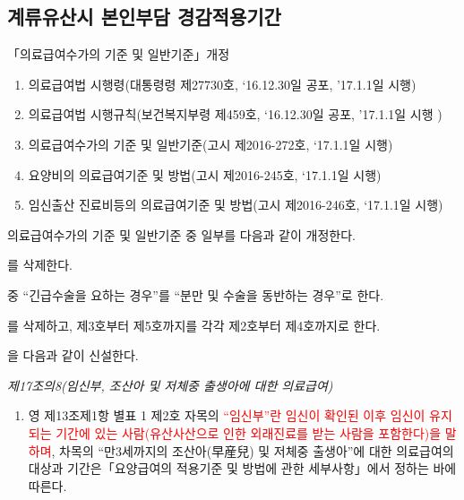 \subsection{계류유산시 본인부담 경감적용기간}
\begin{commentbox}{「의료급여수가의 기준 및 일반기준」개정}
\begin{enumerate}[1)]\tightlist
\item 의료급여법 시행령(대통령령 제27730호, ‘16.12.30일 공포, ’17.1.1일 시행)
\item 의료급여법 시행규칙(보건복지부령 제459호, ‘16.12.30일 공포, ’17.1.1일 시행 )
\item 의료급여수가의 기준 및 일반기준(고시 제2016-272호, ‘17.1.1일 시행)
\item 요양비의 의료급여기준 및 방법(고시 제2016-245호, ‘17.1.1일 시행)
\item 임신\cntrdot{}출산 진료비등의 의료급여기준 및 방법(고시 제2016-246호, ‘17.1.1일 시행)
\end{enumerate}

의료급여수가의 기준 및 일반기준 중 일부를 다음과 같이 개정한다.
\begin{description}\tightlist
\item[제4조]를 삭제한다.
\item[제5조제1항제1호] 중 “긴급수술을 요하는 경우”를 “분만 및 수술을 동반하는 경우”로 한다. 
\item[제5조제1항제2호] 를 삭제하고, 제3호부터 제5호까지를 각각 제2호부터 제4호까지로 한다.
\item[제17조의8]을 다음과 같이 신설한다.
\end{description}
\emph{제17조의8(임신부, 조산아 및 저체중 출생아에 대한 의료급여)}
\begin{enumerate}[①]\tightlist
\item 영 제13조제1항 별표 1 제2호 자목의 \textcolor{red}{“임신부”란 임신이 확인된 이후 임신이 유지되는 기간에 있는 사람(유산\cntrdot{}사산으로 인한 외래진료를 받는 사람을 포함한다)을 말하며}, 차목의 “만3세까지의 조산아(早産兒) 및 저체중 출생아”에 대한 의료급여의 대상과 기간은「요양급여의 적용기준 및 방법에 관한 세부사항」에서 정하는 바에 따른다.
\end{enumerate}
\end{commentbox}
\prezi{\clearpage} 
\prezi{\clearpage}
